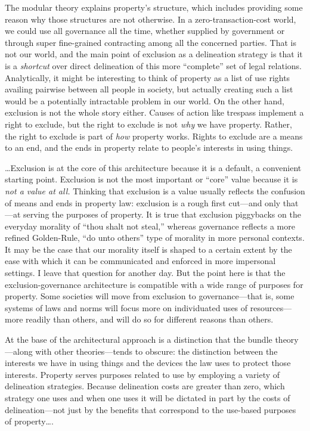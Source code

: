 The modular theory explains property's structure, which includes providing some
reason why those structures are not otherwise. In a zero-transaction-cost
world, we could use all governance all the time, whether supplied by government
or through super fine-grained contracting among all the concerned parties. That
is not our world, and the main point of exclusion as a delineation strategy is
that it is a \textit{shortcut} over direct delineation of this more
``complete'' set of legal relations. Analytically, it might be interesting to
think of property as a list of use rights availing pairwise between all people
in society, but actually creating such a list would be a potentially
intractable problem in our world. On the other hand, exclusion is not the whole
story either. Causes of action like trespass implement a right to exclude, but
the right to exclude is not \textit{why} we have property. Rather, the right to
exclude is part of \textit{how} property works. Rights to exclude are a means
to an end, and the ends in property relate to people's interests in using
things.

\ldots Exclusion is at the core of this architecture because it is a default, a
convenient starting point. Exclusion is not the most important or ``core''
value because it is \textit{not a value at all.} Thinking that exclusion is a
value usually reflects the confusion of means and ends in property law:
exclusion is a rough first cut---and only that---at serving the purposes of
property. It is true that exclusion piggybacks on the everyday morality of
``thou shalt not steal,'' whereas governance reflects a more refined
Golden-Rule, ``do unto others'' type of morality in more personal contexts. It
may be the case that our morality itself is shaped to a certain extent by the
ease with which it can be communicated and enforced in more impersonal
settings. I leave that question for another day. But the point here is that the
exclusion-governance architecture is compatible with a wide range of purposes
for property. Some societies will move from exclusion to governance---that is,
some systems of laws and norms will focus more on individuated uses of
resources---more readily than others, and will do so for different reasons than
others.

At the base of the architectural approach is a distinction that the bundle
theory---along with other theories---tends to obscure: the distinction between
the interests we have in using things and the devices the law uses to protect
those interests. Property serves purposes related to use by employing a variety
of delineation strategies. Because delineation costs are greater than zero,
which strategy one uses and when one uses it will be dictated in part by the
costs of delineation---not just by the benefits that correspond to the
use-based purposes of property\ldots .


